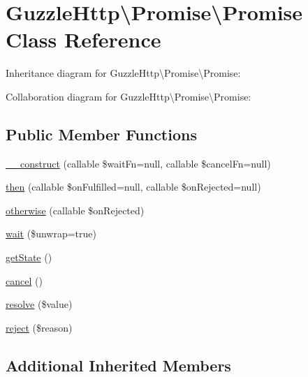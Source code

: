 \hypertarget{classGuzzleHttp_1_1Promise_1_1Promise}{}\section{Guzzle\+Http\textbackslash{}Promise\textbackslash{}Promise Class Reference}
\label{classGuzzleHttp_1_1Promise_1_1Promise}


Inheritance diagram for Guzzle\+Http\textbackslash{}Promise\textbackslash{}Promise\+:


Collaboration diagram for Guzzle\+Http\textbackslash{}Promise\textbackslash{}Promise\+:
\subsection*{Public Member Functions}
\begin{DoxyCompactItemize}
\item 
\hyperlink{classGuzzleHttp_1_1Promise_1_1Promise_a7fa14a63ae6975fc69135cd92442a0b8}{\+\_\+\+\_\+construct} (callable \$wait\+Fn=null, callable \$cancel\+Fn=null)
\item 
\hyperlink{classGuzzleHttp_1_1Promise_1_1Promise_a3f45723dce9315b6dcc5639f897c77b3}{then} (callable \$on\+Fulfilled=null, callable \$on\+Rejected=null)
\item 
\hyperlink{classGuzzleHttp_1_1Promise_1_1Promise_a16b5c01afbddded8703161ec2f6694ad}{otherwise} (callable \$on\+Rejected)
\item 
\hyperlink{classGuzzleHttp_1_1Promise_1_1Promise_abada4a05cb1b6e162db6567872415dad}{wait} (\$unwrap=true)
\item 
\hyperlink{classGuzzleHttp_1_1Promise_1_1Promise_a598a43e196fc3fd6445a9ca5e5b974f3}{get\+State} ()
\item 
\hyperlink{classGuzzleHttp_1_1Promise_1_1Promise_a5e84ab7b355948f9e5ce0ee5ae76d864}{cancel} ()
\item 
\hyperlink{classGuzzleHttp_1_1Promise_1_1Promise_ac36ed471a473ef124c4561d8351d39fb}{resolve} (\$value)
\item 
\hyperlink{classGuzzleHttp_1_1Promise_1_1Promise_af081d064b1d12bd61025907c94e7b4dd}{reject} (\$reason)
\end{DoxyCompactItemize}
\subsection*{Additional Inherited Members}


